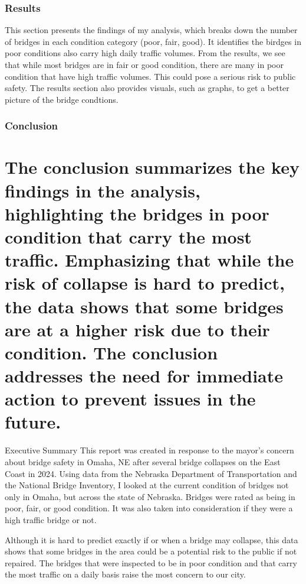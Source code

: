 \documentclass[
  letterpaper,
  DIV=11,
  numbers=noendperiod]{scrreprt}
\begin{document}
\subsection{Results}\label{results-4}

This section presents the findings of my analysis, which breaks down the
number of bridges in each condition category (poor, fair, good). It
identifies the birdges in poor conditions also carry high daily traffic
volumes. From the results, we see that while most bridges are in fair or
good condition, there are many in poor condition that have high traffic
volumes. This could pose a serious risk to public safety. The results
section also provides visuals, such as graphs, to get a better picture
of the bridge condtions.

\subsection{Conclusion}\label{conclusion-4}

\chapter{The conclusion summarizes the key findings in the analysis,
highlighting the bridges in poor condition that carry the most traffic.
Emphasizing that while the risk of collapse is hard to predict, the data
shows that some bridges are at a higher risk due to their condition. The
conclusion addresses the need for immediate action to prevent issues in
the
future.}\label{the-conclusion-summarizes-the-key-findings-in-the-analysis-highlighting-the-bridges-in-poor-condition-that-carry-the-most-traffic.-emphasizing-that-while-the-risk-of-collapse-is-hard-to-predict-the-data-shows-that-some-bridges-are-at-a-higher-risk-due-to-their-condition.-the-conclusion-addresses-the-need-for-immediate-action-to-prevent-issues-in-the-future.}

Executive Summary This report was created in response to the mayor's
concern about bridge safety in Omaha, NE after several bridge collapses
on the East Coast in 2024. Using data from the Nebraska Department of
Transportation and the National Bridge Inventory, I looked at the
current condition of bridges not only in Omaha, but across the state of
Nebraska. Bridges were rated as being in poor, fair, or good condition.
It was also taken into consideration if they were a high traffic bridge
or not.

Although it is hard to predict exactly if or when a bridge may collapse,
this data shows that some bridges in the area could be a potential risk
to the public if not repaired. The bridges that were inspected to be in
poor condition and that carry the most traffic on a daily basis raise
the most concern to our city.
\end{document}
